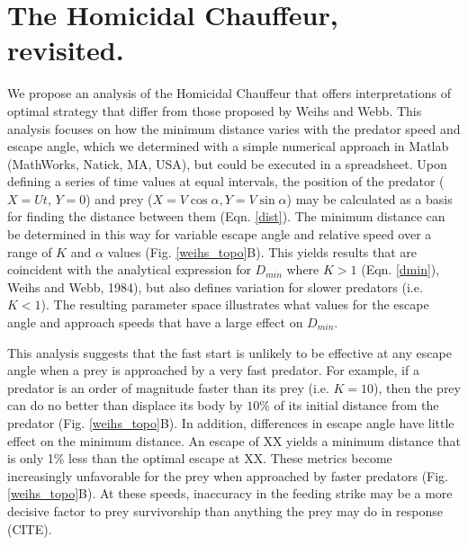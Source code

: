\documentclass[12pt]{article}
\begin{document}
\section{The Homicidal Chauffeur, revisited.}

We propose an analysis of the Homicidal Chauffeur that offers interpretations of optimal strategy that differ from those proposed by Weihs and Webb. This analysis focuses on how the minimum distance varies with the predator speed and escape angle, which we determined with a simple numerical approach in Matlab (MathWorks, Natick, MA, USA), but could be executed in a spreadsheet. Upon defining a series of time values at equal intervals, the position of the predator ($X = Ut$, $Y = 0$) and prey ($X=V\cos\alpha,Y=V\sin\alpha$) may be calculated as a basis for finding the distance between them (Eqn. \ref{dist}). The minimum distance can be determined in this way for variable escape angle and relative speed over a range of $K$ and $\alpha$ values (Fig. \ref{weihs_topo}B). This yields results that are coincident with the analytical expression for $D_{min}$ where $K>1$ (Eqn. \ref{dmin}), Weihs and Webb, 1984), but also defines variation for slower predators (i.e. $K<1$). The resulting parameter space illustrates what values for the escape angle and approach speeds that have a large effect on $D_{min}$.

This analysis suggests that the fast start is unlikely to be effective at any escape angle when a prey is approached by a very fast predator. For example, if a predator is an order of magnitude faster than its prey (i.e. $K=10$), then the prey can do no better than displace its body by $10\%$ of its initial distance from the predator (Fig. \ref{weihs_topo}B). In addition, differences in escape angle have little effect on the minimum distance. An escape of  XX\textdegree\hspace{2pt} yields a minimum distance that is only 1\% less than the optimal escape at XX\textdegree. These metrics become increasingly unfavorable for the prey when approached by faster predators (Fig. \ref{weihs_topo}B). At these speeds, inaccuracy in the feeding strike may be a more decisive factor to prey survivorship than anything the prey may do in response (CITE).
\end{document}
